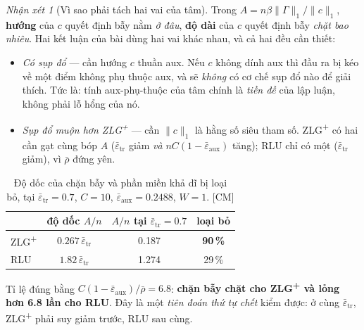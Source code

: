 \documentclass[11pt,a4paper]{article}
\theoremstyle{remark}
\newtheorem{nhanxet}[dinhly]{Nhận xét}
\newcommand{\epstr}{\bar\varepsilon_{\mathrm{tr}}}
\newcommand{\epsaux}{\bar\varepsilon_{\mathrm{aux}}}
\newcommand{\CM}{\textsf{[CM]}}
\begin{document}
\begin{nhanxet}[Vì sao phải tách hai vai của tâm] \label{nx:haivai}
Trong $A=n\beta\|\Gamma\|_1/\|c\|_1$, \textbf{hướng} của $c$ quyết định bẫy nằm
\emph{ở đâu}, \textbf{độ dài} của $c$ quyết định bẫy \emph{chặt bao nhiêu}. Hai
kết luận của bài dùng hai vai khác nhau, và cả hai đều cần thiết:
\begin{itemize}
\item \emph{Có sụp đổ} --- cần hướng $c$ thuần aux. Nếu $c$ không dính aux thì
đầu ra bị kéo về một điểm không phụ thuộc aux, và sẽ \emph{không} có cơ chế sụp
đổ nào để giải thích. Tức là: tính aux-phụ-thuộc của tâm chính là \emph{tiền
đề} của lập luận, không phải lỗ hổng của nó.
\item \emph{Sụp đổ muộn hơn ZLG\textsuperscript{+}} --- cần $\|c\|_1$ là hằng
số siêu tham số. ZLG\textsuperscript{+} có hai cần gạt cùng bóp $A$ ($\epstr$
giảm \emph{và} $nC(1-\epsaux)$ tăng); RLU chỉ có một ($\epstr$ giảm), vì
$\bar\rho$ đứng yên.
\end{itemize}
\end{nhanxet}

\begin{table}[htbp]
\centering
\caption{Độ dốc của chặn bẫy và phần miền khả dĩ bị loại bỏ, tại
$\epstr=0.7$, $C=10$, $\epsaux=0.2488$, $W=1$. \CM}
\label{tab:dodoc}
\small
\begin{tabular}{@{}lccc@{}}
\toprule
 & độ dốc $A/n$ & $A/n$ tại $\epstr=0.7$ & loại bỏ \\
\midrule
ZLG\textsuperscript{+} & $0.267\,\epstr$ & 0.187 & \textbf{90\,\%} \\
RLU                    & $1.82\,\epstr$  & 1.274 & 29\,\% \\
\bottomrule
\end{tabular}
\end{table}

Tỉ lệ đúng bằng $C(1-\epsaux)/\bar\rho=6.8$: \textbf{chặn bẫy chặt cho
ZLG\textsuperscript{+} và lỏng hơn 6.8 lần cho RLU}. Đây là một \emph{tiên đoán
thứ tự chết} kiểm được: ở cùng $\epstr$, ZLG\textsuperscript{+} phải suy giảm
trước, RLU sau cùng.
\end{document}
